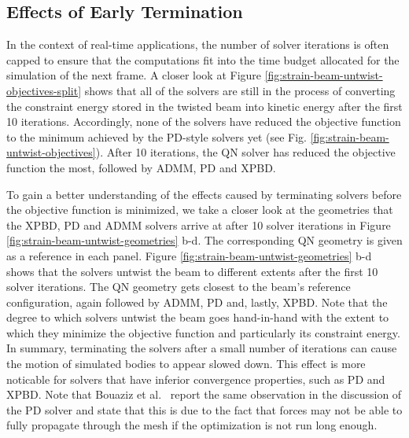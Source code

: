 \subsection{Effects of Early Termination}\label{ss:early-termination}
In the context of real-time applications, the number of solver iterations is often capped to ensure that the computations fit into the time budget allocated 
for the simulation of the next frame. A closer look at Figure \ref{fig:strain-beam-untwist-objectives-split} shows that all of the solvers are still in the process of 
converting the constraint energy stored in the twisted beam into kinetic energy after the first 10 iterations. Accordingly, none of the solvers have reduced the 
objective function to the minimum achieved by the PD-style solvers yet (see Fig. \ref{fig:strain-beam-untwist-objectives}). After 10 iterations, the QN solver has reduced 
the objective function the most, followed by ADMM, PD and XPBD. 

To gain a better understanding of the effects caused by terminating solvers before the objective function is minimized, we take a 
closer look at the geometries that the XPBD, PD and ADMM solvers arrive at after 10 solver iterations in Figure \ref{fig:strain-beam-untwist-geometries} b-d. The 
corresponding QN geometry is given as a reference in each panel. Figure \ref{fig:strain-beam-untwist-geometries} b-d shows that the solvers untwist the beam to 
different extents after the first 10 solver iterations. The QN geometry gets closest to the beam's reference configuration, again followed by ADMM, PD and, lastly, 
XPBD. Note that the degree to which solvers untwist the beam goes hand-in-hand with the extent to which they minimize the objective function and particularly its 
constraint energy. In summary, terminating the solvers after a small number of iterations can cause the motion of simulated bodies to appear slowed down. 
This effect is more noticable for solvers that have inferior convergence properties, such as PD and XPBD. Note that Bouaziz et al.\ \cite{bouaziz2014} report 
the same observation in the discussion of the PD solver and state that this is due to the fact that forces may not be able to fully propagate through the mesh 
if the optimization is not run long enough. 


